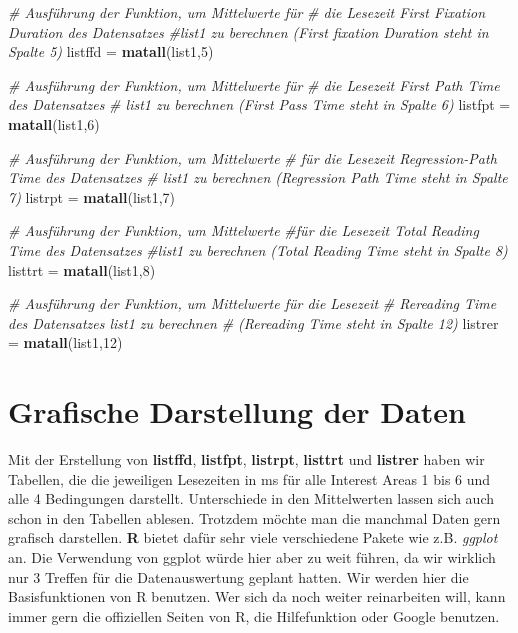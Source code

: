 \documentclass[]{book}
\newenvironment{Shaded}{\begin{snugshade}}{\end{snugshade}}
\newcommand{\KeywordTok}[1]{\textcolor[rgb]{0.13,0.29,0.53}{\textbf{#1}}}
\newcommand{\DecValTok}[1]{\textcolor[rgb]{0.00,0.00,0.81}{#1}}
\newcommand{\StringTok}[1]{\textcolor[rgb]{0.31,0.60,0.02}{#1}}
\newcommand{\CommentTok}[1]{\textcolor[rgb]{0.56,0.35,0.01}{\textit{#1}}}
\newcommand{\NormalTok}[1]{#1}
\begin{document}
\begin{Shaded}
\begin{Highlighting}[]
\CommentTok{# Ausführung der Funktion, um Mittelwerte für }
\CommentTok{# die Lesezeit First Fixation Duration des Datensatzes}
\CommentTok{#list1 zu berechnen (First fixation Duration steht in Spalte 5)}
\NormalTok{listffd =}\StringTok{ }\KeywordTok{matall}\NormalTok{(list1,}\DecValTok{5}\NormalTok{)}

\CommentTok{# Ausführung der Funktion, um Mittelwerte für }
\CommentTok{# die Lesezeit First Path Time des Datensatzes }
\CommentTok{# list1 zu berechnen (First Pass Time steht in Spalte 6)}
\NormalTok{listfpt =}\StringTok{ }\KeywordTok{matall}\NormalTok{(list1,}\DecValTok{6}\NormalTok{)}

\CommentTok{# Ausführung der Funktion, um Mittelwerte }
\CommentTok{# für die Lesezeit Regression-Path Time des Datensatzes}
\CommentTok{# list1 zu berechnen (Regression Path Time steht in Spalte 7)}
\NormalTok{listrpt =}\StringTok{ }\KeywordTok{matall}\NormalTok{(list1,}\DecValTok{7}\NormalTok{)}

\CommentTok{# Ausführung der Funktion, um Mittelwerte }
\CommentTok{#für die Lesezeit Total Reading Time des Datensatzes}
\CommentTok{#list1 zu berechnen (Total Reading Time steht in Spalte 8)}
\NormalTok{listtrt =}\StringTok{ }\KeywordTok{matall}\NormalTok{(list1,}\DecValTok{8}\NormalTok{)}

\CommentTok{# Ausführung der Funktion, um Mittelwerte für die Lesezeit}
\CommentTok{# Rereading Time des Datensatzes list1 zu berechnen }
\CommentTok{# (Rereading Time steht in Spalte 12)}
\NormalTok{listrer =}\StringTok{ }\KeywordTok{matall}\NormalTok{(list1,}\DecValTok{12}\NormalTok{)}
\end{Highlighting}
\end{Shaded}

\section{Grafische Darstellung der
Daten}\label{grafische-darstellung-der-daten}

Mit der Erstellung von \textbf{listffd}, \textbf{listfpt},
\textbf{listrpt}, \textbf{listtrt} und \textbf{listrer} haben wir
Tabellen, die die jeweiligen Lesezeiten in ms für alle Interest Areas 1
bis 6 und alle 4 Bedingungen darstellt. Unterschiede in den Mittelwerten
lassen sich auch schon in den Tabellen ablesen. Trotzdem möchte man die
manchmal Daten gern grafisch darstellen. \textbf{R} bietet dafür sehr
viele verschiedene Pakete wie z.B. \emph{ggplot} an. Die Verwendung von
ggplot würde hier aber zu weit führen, da wir wirklich nur 3 Treffen für
die Datenauswertung geplant hatten. Wir werden hier die Basisfunktionen
von R benutzen. Wer sich da noch weiter reinarbeiten will, kann immer
gern die offiziellen Seiten von R, die Hilfefunktion oder Google
benutzen.
\end{document}
